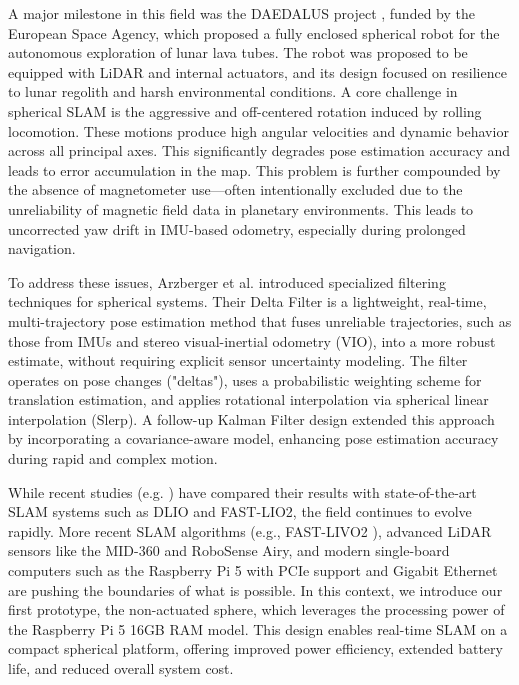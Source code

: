 \documentclass[english, bachelor, utf8]{base/thesis_telematics}
\begin{document}
A major milestone in this field was the DAEDALUS project \cite{DAEDALUS}, funded by the European Space Agency, which proposed a fully enclosed spherical robot for the autonomous exploration of lunar lava tubes. 
The robot was proposed to be equipped with LiDAR and internal actuators, and its design focused on resilience to lunar regolith and harsh environmental conditions.
A core challenge in spherical SLAM is the aggressive and off-centered rotation induced by rolling locomotion. 
These motions produce high angular velocities and dynamic behavior across all principal axes. 
This significantly degrades pose estimation accuracy and leads to error accumulation in the map. 
This problem is further compounded by the absence of magnetometer use—often intentionally excluded due to the unreliability of magnetic field data in planetary environments.
This leads to uncorrected yaw drift in IMU-based odometry, especially during prolonged navigation.

To address these issues, Arzberger et al. \cite{Kalman_filter_sphere,sphere_Fabi_1,DeltaFilter} introduced specialized filtering techniques for spherical systems. 
Their Delta Filter is a lightweight, real-time, multi-trajectory pose estimation method that fuses unreliable trajectories, such as those from IMUs and stereo visual-inertial odometry (VIO), into a more robust estimate, without requiring explicit sensor uncertainty modeling. 
The filter operates on pose changes ("deltas"), uses a probabilistic weighting scheme for translation estimation, and applies rotational interpolation via spherical linear interpolation (Slerp). 
A follow-up Kalman Filter design extended this approach by incorporating a covariance-aware model, enhancing pose estimation accuracy during rapid and complex motion.

While recent studies (e.g. \cite{Kalman_filter_sphere}) have compared their results with state-of-the-art SLAM systems such as DLIO\cite{dlio} and FAST-LIO2\cite{fastlio2}, the field continues to evolve rapidly. 
More recent SLAM algorithms (e.g., FAST-LIVO2 \cite{fastlivo2}), advanced LiDAR sensors like the MID-360 and RoboSense Airy, and modern single-board computers such as the Raspberry Pi 5 with PCIe support and Gigabit Ethernet are pushing the boundaries of what is possible. 
In this context, we introduce our first prototype, the non-actuated sphere, which leverages the processing power of the Raspberry Pi 5 16GB RAM model. 
This design enables real-time SLAM on a compact spherical platform, offering improved power efficiency, extended battery life, and reduced overall system cost.
\end{document}
